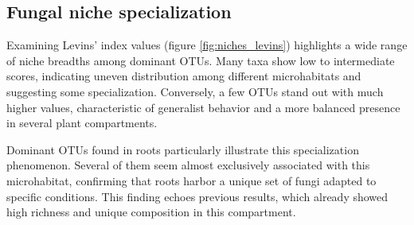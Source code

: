 \documentclass[alpha-refs,twocolumn]{wiley-article}
\begin{document}
\begin{table}[htbp]
       \centering
       \caption{Results of fungal community structure analyses by NMDS and PERMANOVA according to the panels presented in figure \ref{fig:nmds}.}
       \label{tab:permanova_nmds}
       \vspace{0.5cm}
       \renewcommand{\arraystretch}{1.2}
       \setlength{\tabcolsep}{8pt}
\end{table}

\subsection{Fungal niche specialization}

Examining Levins' index values (figure \ref{fig:niches_levins}) highlights a wide range of niche breadths among dominant OTUs. Many taxa show low to intermediate scores, indicating uneven distribution among different microhabitats and suggesting some specialization. Conversely, a few OTUs stand out with much higher values, characteristic of generalist behavior and a more balanced presence in several plant compartments.

Dominant OTUs found in roots particularly illustrate this specialization phenomenon. Several of them seem almost exclusively associated with this microhabitat, confirming that roots harbor a unique set of fungi adapted to specific conditions. This finding echoes previous results, which already showed high richness and unique composition in this compartment.
\end{document}
